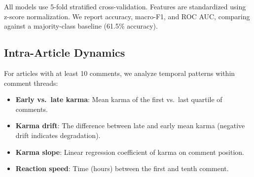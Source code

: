 All models use 5-fold stratified cross-validation.
Features are standardized using z-score normalization.
We report accuracy, macro-F1, and ROC AUC, comparing against a majority-class baseline (61.5\% accuracy).

\subsection{Intra-Article Dynamics}

For articles with at least 10 comments, we analyze temporal patterns within comment threads:
\begin{itemize}
    \item \textbf{Early vs.\ late karma}: Mean karma of the first vs.\ last quartile of comments.
    \item \textbf{Karma drift}: The difference between late and early mean karma (negative drift indicates degradation).
    \item \textbf{Karma slope}: Linear regression coefficient of karma on comment position.
    \item \textbf{Reaction speed}: Time (hours) between the first and tenth comment.
\end{itemize}
